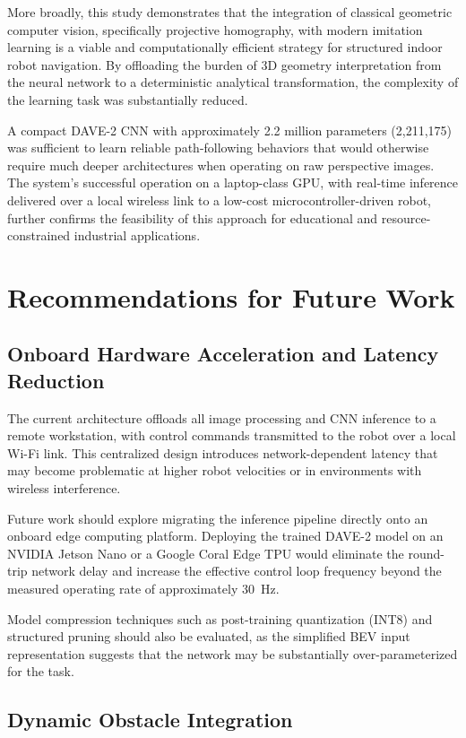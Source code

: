 More broadly, this study demonstrates that the integration of classical geometric computer vision, specifically projective homography, with modern imitation learning is a viable and computationally efficient strategy for structured indoor robot navigation. By offloading the burden of 3D geometry interpretation from the neural network to a deterministic analytical transformation, the complexity of the learning task was substantially reduced.

A compact DAVE-2 CNN with approximately 2.2 million parameters (2{,}211{,}175) was sufficient to learn reliable path-following behaviors that would otherwise require much deeper architectures when operating on raw perspective images. The system's successful operation on a laptop-class GPU, with real-time inference delivered over a local wireless link to a low-cost microcontroller-driven robot, further confirms the feasibility of this approach for educational and resource-constrained industrial applications.

\section{Recommendations for Future Work}

\subsection{Onboard Hardware Acceleration and Latency Reduction}

The current architecture offloads all image processing and CNN inference to a remote workstation, with control commands transmitted to the robot over a local Wi-Fi link. This centralized design introduces network-dependent latency that may become problematic at higher robot velocities or in environments with wireless interference.

Future work should explore migrating the inference pipeline directly onto an onboard edge computing platform. Deploying the trained DAVE-2 model on an NVIDIA Jetson Nano or a Google Coral Edge TPU would eliminate the round-trip network delay and increase the effective control loop frequency beyond the measured operating rate of approximately 30~Hz.

Model compression techniques such as post-training quantization (INT8) and structured pruning should also be evaluated, as the simplified BEV input representation suggests that the network may be substantially over-parameterized for the task.

\subsection{Dynamic Obstacle Integration}

